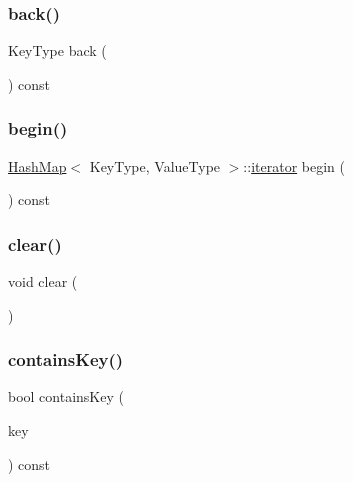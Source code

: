 \mbox{\label{classHashMap_adfa4b8f8e4f5ecc11fb76a3efba70d70}} 
\subsubsection{\texorpdfstring{back()}{back()}}
{\footnotesize\ttfamily Key\+Type back (\begin{DoxyParamCaption}{ }\end{DoxyParamCaption}) const}

\mbox{\label{classHashMap_a34956cd3bc086bee3fe9db3a154fa27c}} 
\subsubsection{\texorpdfstring{begin()}{begin()}}
{\footnotesize\ttfamily \mbox{\hyperlink{classHashMap}{Hash\+Map}}$<$ Key\+Type, Value\+Type $>$\+::\mbox{\hyperlink{classHashMap_ab3d10e70baaeac78e76b7abae7e2cf76}{iterator}} begin (\begin{DoxyParamCaption}{ }\end{DoxyParamCaption}) const}

\mbox{\label{classHashMap_ac8bb3912a3ce86b15842e79d0b421204}} 
\subsubsection{\texorpdfstring{clear()}{clear()}}
{\footnotesize\ttfamily void clear (\begin{DoxyParamCaption}{ }\end{DoxyParamCaption})}

\mbox{\label{classHashMap_a37473445b6725c5f0fc59a32ea2e645e}} 
\subsubsection{\texorpdfstring{contains\+Key()}{containsKey()}}
{\footnotesize\ttfamily bool contains\+Key (\begin{DoxyParamCaption}\item[{const Key\+Type \&}]{key }\end{DoxyParamCaption}) const}

